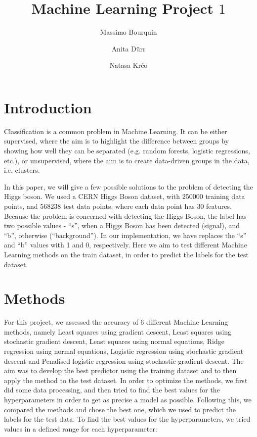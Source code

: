 \documentclass{article}
\begin{document}
	\title{Machine Learning Project $1$}
	
	\author{Massimo Bourquin \and Anita D\" urr \and Natasa Kr\v co}
	
	\maketitle
	
	\section{Introduction}
	
	Classification is a common problem in Machine Learning. It can be either supervised, where the aim is to highlight the difference between groups by showing how well they can be separated (e.g. random forests, logistic regressions, etc.), or unsupervised, where the aim is to create data-driven groups in the data, i.e. clusters.
	
	In this paper, we will give a few possible solutions to the problem of detecting the Higgs boson. We used a CERN Higgs Boson dataset, with $250000$ training data points, and $568238$ test data points, where each data point has 30 features. Because the problem is concerned with detecting the Higgs Boson, the label has two possible values - “s”, when a Higgs Boson has been detected (signal), and “b”, otherwise (“background”). In our implementation, we have replaces the “s” and “b” values with 1 and 0, respectively.
	Here we aim to test different Machine Learning methods on the train dataset, in order to predict the labels for the test dataset.
	
	
	\section{Methods}
	For this project, we assessed the accuracy of 6 different Machine Learning methods, namely Least squares using gradient descent, Least squares using stochastic gradient descent, Least squares using normal equations, Ridge regression using normal equations, Logistic regression using stochastic gradient descent and Penalised logistic regression using stochastic gradient descent. The aim was to develop the best predictor using the training dataset and to then apply the method to the test dataset.
	In order to optimize the methods, we first did some data processing, and then tried to find the best values for the hyperparameters in order to get as precise a model as possible. Following this, we compared the methods and chose the best one, which we used to predict the labels for the test data. To find the best values for the hyperparameters, we tried values in a defined range for each hyperparameter:
	
\end{document}

